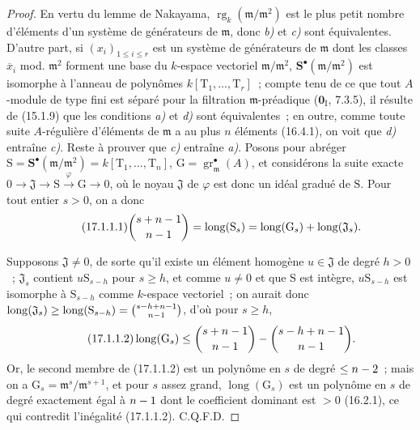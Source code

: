 \begin{proof}
En vertu du lemme de Nakayama,
$\operatorname{rg}_k(\mathfrak{m}/\mathfrak{m}^2)$ est le plus petit nombre
d'éléments d'un système de générateurs de $\mathfrak{m}$, donc \emph{b)} et \emph{c)} sont
équivalentes. D'autre part, si $(x_i)_{1\leq i\leq r}$ est un système de
générateurs de $\mathfrak{m}$ dont les classes $\overline{x}_i$ mod.
$\mathfrak{m}^2$ forment une base du $k$-espace vectoriel
$\mathfrak{m}/\mathfrak{m}^2$, $\mathbf{S}^\bullet(\mathfrak{m}/\mathfrak{m}^2)$
est isomorphe à l'anneau de
polynômes $k[\mathrm{T}_1,\ldots,\mathrm{T}_r]$~; compte tenu de ce que tout
$A$-module de type fini est séparé pour la filtration $\mathfrak{m}$-préadique
($\mathbf{0}_{\mathrm I}$, 7.3.5), il résulte de (15.1.9) que les conditions \emph{a)} et \emph{d)}
sont équivalentes~; en outre, comme toute suite $A$-régulière d'éléments de
$\mathfrak{m}$ a au plus $n$ éléments (16.4.1), on voit que \emph{d)} entraîne \emph{c)}.
Reste à prouver que \emph{c)} entraîne \emph{a)}.
Posons pour abréger
$\mathrm{S}=\mathbf{S}^\bullet(\mathfrak{m}/\mathfrak{m}^2)
=k[\mathrm{T}_1,\ldots,\mathrm{T}_n]$,
$\mathrm{G}=\operatorname{gr}^\bullet_{\mathfrak{m}}(A)$, et considérons la suite
exacte
$0\longrightarrow\mathfrak{J}\longrightarrow\mathrm{S}
\xrightarrow{\varphi}\mathrm{G}\longrightarrow0$, où le noyau
$\mathfrak{J}$ de $\varphi$ est donc un idéal gradué de $\mathrm{S}$. Pour
tout entier $s>0$, on a donc
\begin{equation}
\label{0.17.1.1.1-fr}
\tag{17.1.1.1}
  \binom{s+n- 1}{n- 1}
  =\operatorname{long}(\mathrm{S}_s)
  =\operatorname{long}(\mathrm{G}_s)
  +\operatorname{long}(\mathfrak{J}_s).
\end{equation}

Supposons $\mathfrak{J}\neq0$, de sorte qu'il existe un élément homogène
$u\in\mathfrak{J}$ de degré $h>0$~; $\mathfrak{J}_s$ contient
$u\mathrm{S}_{s-h}$ pour $s\geq h$, et comme $u\neq0$ et que $\mathrm{S}$ est
intègre, $u\mathrm{S}_{s-h}$ est isomorphe à $\mathrm{S}_{s-h}$ comme
$k$-espace vectoriel~; on aurait donc
$\operatorname{long}(\mathfrak{J}_s)\geq
\operatorname{long}(\mathrm{S}_{s-h})=\binom{s- h+n- 1}{n- 1}$, d'où pour
$s\geq h$,
\begin{equation}
\label{0.17.1.1.2-fr}
\tag{17.1.1.2}
  \operatorname{long}(\mathrm{G}_s)
  \leq\binom{s+n- 1}{n- 1}-\binom{s- h+n- 1}{n- 1}.
\end{equation}
Or, le second membre de (17.1.1.2) est un polynôme en $s$ de degré
$\leq n- 2$~; mais on a
$\mathrm{G}_s=\mathfrak{m}^s/\mathfrak{m}^{s+1}$, et pour $s$ assez grand,
$\operatorname{long}(\mathrm{G}_s)$ est un polynôme en $s$ de degré exactement
égal à $n- 1$ dont le coefficient dominant est $>0$ (16.2.1), ce qui contredit
l'inégalité (17.1.1.2). C.Q.F.D.
\end{proof}

